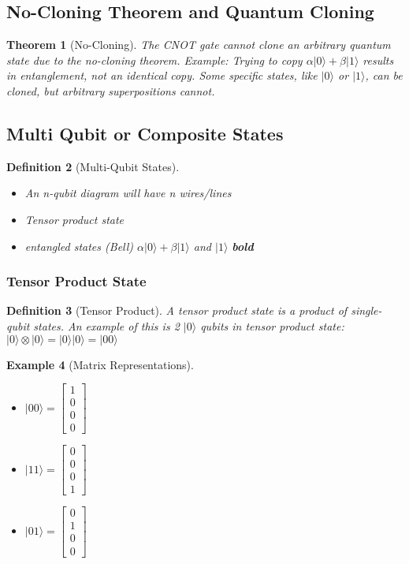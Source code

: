 \documentclass{article}
\newtheorem{theorem}{Theorem}[subsection]
\newtheorem{definition}[theorem]{Definition}
\newtheorem{example}[theorem]{Example}
\begin{document}
\subsection{No-Cloning Theorem and Quantum Cloning}
\begin{theorem}[No-Cloning]
The CNOT gate cannot clone an arbitrary quantum state due to the no-cloning theorem. Example: Trying to copy \(\alpha|0\rangle + \beta|1\rangle\) results in entanglement, not an identical copy. Some specific states, like \(|0\rangle\) or \(|1\rangle\), can be cloned, but arbitrary superpositions cannot.
\end{theorem}

\subsection{Multi Qubit or Composite States}
\begin{definition}[Multi-Qubit States]
\begin{itemize}
    \item An n-qubit diagram will have n wires/lines
    \item Tensor product state
    \item entangled states (Bell) \(\alpha|0\rangle + \beta|1\rangle\)  and \(|1\rangle\) \textbf{bold}
\end{itemize}
\end{definition}

\subsubsection{Tensor Product State}
\begin{definition}[Tensor Product]
A tensor product state is a product of single-qubit states. An example of this is 2 \(|0\rangle\) qubits in tensor product state: \(|0\rangle \otimes |0\rangle = |0\rangle |0\rangle = |00\rangle\)
\end{definition}

\begin{example}[Matrix Representations]
\begin{itemize}
    \item \(|00\rangle = \begin{bmatrix} 1 \\ 0 \\ 0 \\ 0 \end{bmatrix}\)
    \item \(|11\rangle = \begin{bmatrix} 0 \\ 0 \\ 0 \\ 1 \end{bmatrix}\)
    \item \(|01\rangle = \begin{bmatrix} 0 \\ 1 \\ 0 \\ 0 \end{bmatrix}\)
\end{itemize}
\end{example}
\end{document}
